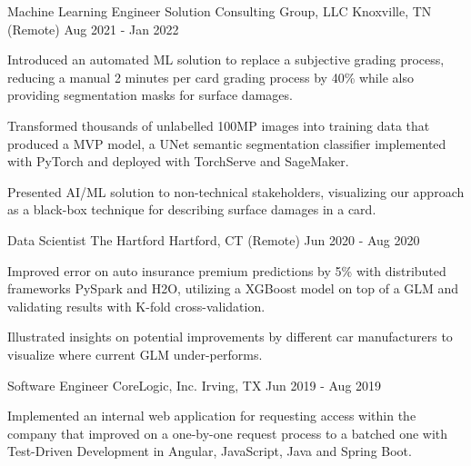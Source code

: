 \begin{cventries}
\cventry
{Machine Learning Engineer} %
{Solution Consulting Group, LLC} %
{Knoxville, TN (Remote)} %
{Aug 2021 - Jan 2022} %
{ %
\begin{cvitems}
\item {Introduced an automated ML solution to replace a subjective grading process, reducing a manual 2 minutes per card grading process by 40\% while also providing segmentation masks for surface damages.}
\item {Transformed thousands of unlabelled 100MP images into training data that produced a MVP model, a UNet semantic segmentation classifier implemented with PyTorch and deployed with TorchServe and SageMaker.}
\item {Presented AI/ML solution to non-technical stakeholders, visualizing our approach as a black-box technique for describing surface damages in a card.}
\end{cvitems}
}


\cventry
{Data Scientist} %
{The Hartford} %
{Hartford, CT (Remote)} %
{Jun 2020 - Aug 2020} %
{ %
\begin{cvitems}
\item {Improved error on auto insurance premium predictions by 5\% with distributed frameworks PySpark and H2O, utilizing a XGBoost model on top of a GLM and validating results with K-fold cross-validation.}
\item {Illustrated insights on potential improvements by different car manufacturers to visualize where current GLM under-performs.}
\end{cvitems} 
}


\cventry
{Software Engineer} %
{CoreLogic, Inc.} %
{Irving, TX} %
{Jun 2019 - Aug 2019} %
{ %
\begin{cvitems}
\item {Implemented an internal web application for requesting access within the company that improved on a one-by-one request process to a batched one with Test-Driven Development in Angular, JavaScript, Java and Spring Boot.}
\end{cvitems}
}


\end{cventries}